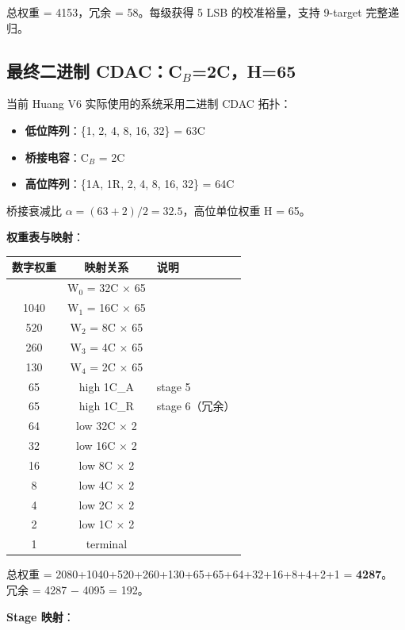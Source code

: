 \documentclass[UTF8,a4paper,12pt]{ctexart}
\theoremstyle{definition}
\begin{document}
总权重 = 4153，冗余 = 58。每级获得 5 LSB 的校准裕量，支持 9-target 完整递归。

\subsection{最终二进制 CDAC：C$_B$=2C，H=65}

当前 Huang V6 实际使用的系统采用二进制 CDAC 拓扑：

\begin{itemize}
  \item \textbf{低位阵列}：\{1, 2, 4, 8, 16, 32\} = 63C
  \item \textbf{桥接电容}：C$_B$ = 2C
  \item \textbf{高位阵列}：\{1A, 1R, 2, 4, 8, 16, 32\} = 64C
\end{itemize}

桥接衰减比 $\alpha = (63+2)/2 = 32.5$，高位单位权重 H = 65。

\textbf{权重表与映射}：

\begin{longtable}{ccl}
\toprule
\textbf{数字权重} & \textbf{映射关系} & \textbf{说明} \\
\midrule
\endhead
\bottomrule
\endfoot
2080 & W$_0$ = 32C $\times$ 65 & \\
1040 & W$_1$ = 16C $\times$ 65 & \\
520 & W$_2$ = 8C $\times$ 65 & \\
260 & W$_3$ = 4C $\times$ 65 & \\
130 & W$_4$ = 2C $\times$ 65 & \\
65  & high 1C\_A & stage 5 \\
65  & high 1C\_R & stage 6（冗余）\\
64  & low 32C $\times$ 2 & \\
32  & low 16C $\times$ 2 & \\
16  & low 8C $\times$ 2 & \\
8   & low 4C $\times$ 2 & \\
4   & low 2C $\times$ 2 & \\
2   & low 1C $\times$ 2 & \\
1   & terminal & \\
\bottomrule
\end{longtable}

总权重 = 2080+1040+520+260+130+65+65+64+32+16+8+4+2+1 = \textbf{4287}。
冗余 = 4287 $-$ 4095 = 192。

\textbf{Stage 映射}：
\end{document}
